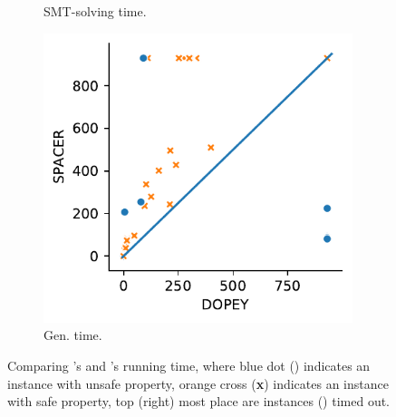 \begin{figure}[t]
\begin{subfigure}[b]{0.48\textwidth}
    \caption{SMT-solving time.}
    \label{subfig:dpy_vs_spc_smt}
	\end{subfigure}
  \begin{subfigure}[b]{0.48\textwidth}
  \centering
    \includegraphics[width=0.99\textwidth]{figures/res-dpy_vs_spc_indgen.pdf}
    \caption{Gen. time.}
    \label{subfig:dpy_vs_spc_ind_gen_sub}
	\end{subfigure}

	\caption{Comparing \dpy's and \spc's running time, where blue dot ({\color{blue}\textbullet}) indicates an instance with unsafe property,  orange cross ({\color{orange}\textbf{x}}) indicates an instance with safe property, top (right) most place are instances \spc (\dpy) timed out.}
  \label{fig:dpy_vs_spc}
\end{figure}


